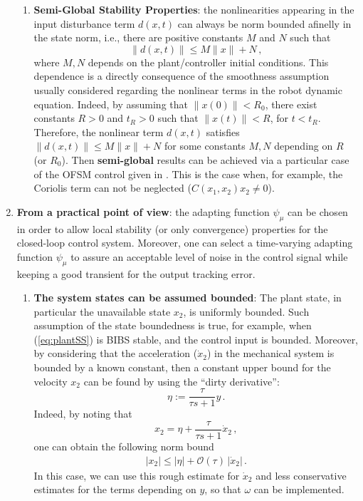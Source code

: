 \documentclass[letterpaper, 10 pt, conference]{ieeeconf}  %
\theoremstyle{plain}
\theoremstyle{definition}
\theoremstyle{remark}
\begin{document}
\begin{enumerate}
\begin{enumerate}
\item {\bf Semi-Global Stability Properties}: the nonlinearities appearing in the input disturbance term $d(x,t)$ can always be norm bounded afinelly in the state norm, i.e., there are positive constants $M$ and $N$ such that 
%
$$\|d(x,t)\| \leq M \|x\| + N\,,$$
%
where $M, N$ depends on the plant/controller initial conditions. This dependence is a directly consequence of the smoothness assumption usually considered regarding the nonlinear terms in the robot dynamic equation. Indeed, by assuming that $\|x(0)\| < R_0$, there exist constants $R>0$ and $t_R>0$ such that  $\|x(t)\| < R$, for $t<t_R$. Therefore, the nonlinear term $d(x,t)$ satisfies $\|d(x,t)\| \leq M \|x\| + N$ for some constants $M, N$ depending on $R$ (or $R_0$). Then {\bf semi-global} results can be achieved via a particular case of the OFSM control given in \cite{POH:2011}. This is the case  when, for example, the Coriolis term can not be neglected ($C(x_1,x_2) x_2 \neq 0$).

\end{enumerate}


\item {\bf From a practical point of view}: the adapting function $\psi_\mu$ can be chosen in order to allow local stability (or only convergence) properties for the closed-loop control system. Moreover, one can select a time-varying adapting function $\psi_\mu$ to assure an acceptable level of noise in the control signal while keeping a good transient for the output tracking error. 

\begin{enumerate}


\item {\bf The system states can be assumed bounded}: The plant state, in particular the unavailable state $x_2$, is uniformly bounded. Such assumption of the state boundedness is true, for example, when (\ref{eq:plantSS}) is BIBS stable, and the control input is bounded. Moreover, by considering that the acceleration ($\dot{x}_2$) in the mechanical system is bounded by a known constant, then a constant  upper bound for the velocity $x_2$ can be found by using the ``dirty derivative'':
%
\begin{equation}
\eta := \frac{\tau}{\tau s+1} y\,.
\end{equation}
%
Indeed, by noting that 
%
\begin{equation}
x_2=\eta + \frac{\tau}{\tau s+1} \dot{x}_2\,,
\end{equation}
%
one can obtain the following norm bound  
%
\begin{align}
	|x_2| \leq |\eta| + \mathcal{O}(\tau) \, |\dot{x}_2| \, .
\end{align}
%
In this case, we can use this rough estimate for $\dot{x}_2$ and less conservative estimates for the terms depending on $y$, so that $\omega$ can be implemented.



\end{enumerate}
\end{enumerate}
\end{document}
